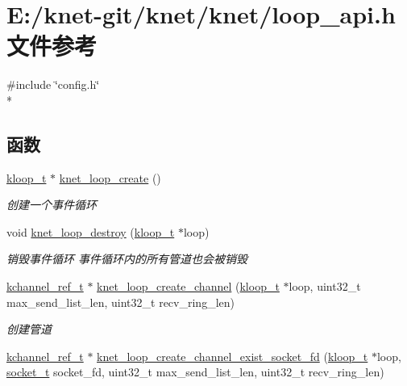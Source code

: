\hypertarget{a00078}{}\section{E\+:/knet-\/git/knet/knet/loop\+\_\+api.h 文件参考}
\label{a00078}
{\ttfamily \#include \char`\"{}config.\+h\char`\"{}}\\*
\subsection*{函数}
\begin{DoxyCompactItemize}
\item 
\hyperlink{a00056_a97fc76209a58362019f1ded9169e397f_a97fc76209a58362019f1ded9169e397f}{kloop\+\_\+t} $\ast$ \hyperlink{a00117_ga2e4181ebe9c1769be90bb8dc0e5cdffe_ga2e4181ebe9c1769be90bb8dc0e5cdffe}{knet\+\_\+loop\+\_\+create} ()
\begin{DoxyCompactList}\small\item\em 创建一个事件循环 \end{DoxyCompactList}\item 
void \hyperlink{a00117_ga390ea3161f935d0d3a411df8752d8b9f_ga390ea3161f935d0d3a411df8752d8b9f}{knet\+\_\+loop\+\_\+destroy} (\hyperlink{a00056_a97fc76209a58362019f1ded9169e397f_a97fc76209a58362019f1ded9169e397f}{kloop\+\_\+t} $\ast$loop)
\begin{DoxyCompactList}\small\item\em 销毁事件循环 事件循环内的所有管道也会被销毁 \end{DoxyCompactList}\item 
\hyperlink{a00056_a3b7e82599367eade261456f60ebe2cd9_a3b7e82599367eade261456f60ebe2cd9}{kchannel\+\_\+ref\+\_\+t} $\ast$ \hyperlink{a00117_gac1f9a4848c06c2a6a2723d7b991b4394_gac1f9a4848c06c2a6a2723d7b991b4394}{knet\+\_\+loop\+\_\+create\+\_\+channel} (\hyperlink{a00056_a97fc76209a58362019f1ded9169e397f_a97fc76209a58362019f1ded9169e397f}{kloop\+\_\+t} $\ast$loop, uint32\+\_\+t max\+\_\+send\+\_\+list\+\_\+len, uint32\+\_\+t recv\+\_\+ring\+\_\+len)
\begin{DoxyCompactList}\small\item\em 创建管道 \end{DoxyCompactList}\item 
\hyperlink{a00056_a3b7e82599367eade261456f60ebe2cd9_a3b7e82599367eade261456f60ebe2cd9}{kchannel\+\_\+ref\+\_\+t} $\ast$ \hyperlink{a00117_gaddfd5a2709d0c26ada8a2dd3fd6a5b62_gaddfd5a2709d0c26ada8a2dd3fd6a5b62}{knet\+\_\+loop\+\_\+create\+\_\+channel\+\_\+exist\+\_\+socket\+\_\+fd} (\hyperlink{a00056_a97fc76209a58362019f1ded9169e397f_a97fc76209a58362019f1ded9169e397f}{kloop\+\_\+t} $\ast$loop, \hyperlink{a00056_a0d9e0afbf02fb6ed6c5b1415dce51b05_a0d9e0afbf02fb6ed6c5b1415dce51b05}{socket\+\_\+t} socket\+\_\+fd, uint32\+\_\+t max\+\_\+send\+\_\+list\+\_\+len, uint32\+\_\+t recv\+\_\+ring\+\_\+len)

\end{DoxyCompactItemize}

